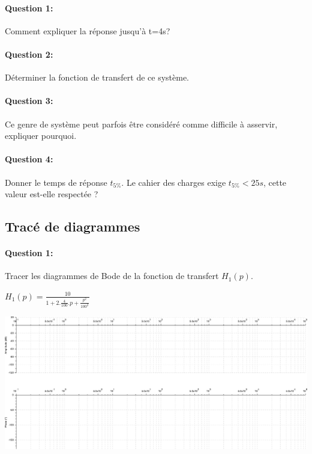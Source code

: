 \paragraph{Question 1:} Comment expliquer la réponse jusqu'à t=4s?

\paragraph{Question 2:} Déterminer la fonction de transfert de ce système.

\paragraph{Question 3:} Ce genre de système peut parfois être considéré comme difficile à asservir, expliquer pourquoi.

\paragraph{Question 4:} Donner le temps de réponse $t_{5\%}$. Le cahier des charges exige $t_{5\%}<25s$, cette valeur est-elle respectée ?

\newpage

\subsection{Tracé de diagrammes}

\paragraph{Question 1:} Tracer les diagrammes de Bode de la fonction de transfert $H_1(p)$.

\begin{center}
$H_1(p)=\frac{10}{1+2.\frac{4}{100}.p+\frac{p^2}{100^2}}$
\end{center}

\begin{center}
 \includegraphics[width=0.9\linewidth]{img/BodeH1}
\end{center}

